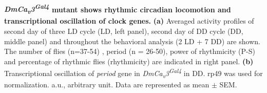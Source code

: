 \label{fig:4}\\
\textbf{ \emph{DmCa\textsubscript{v}3\textsuperscript{Gal4}} mutant shows rhythmic circadian locomotion and transcriptional oscillation of clock genes.} 
\textbf{(a)} Averaged activity profiles of second day of three LD cycle (LD, left panel), second day of DD cycle (DD, middle panel) and throughout the behavioral analysis (2 LD + 7 DD) are shown. 
The number of flies (n=37-54) , period (n = 26-50), power of rhythmicity (P-S) and percentage of rhythmic flies (rhythmicity) are indicated in right panel.  
\textbf{(b)}  Transcriptional oscillation of \emph{period} gene in  \emph{DmCa\textsubscript{v}3\textsuperscript{Gal4}} in DD. rp49 was used for normalization. a.u., arbitrary unit.
Data are represented as mean $\pm$ SEM.